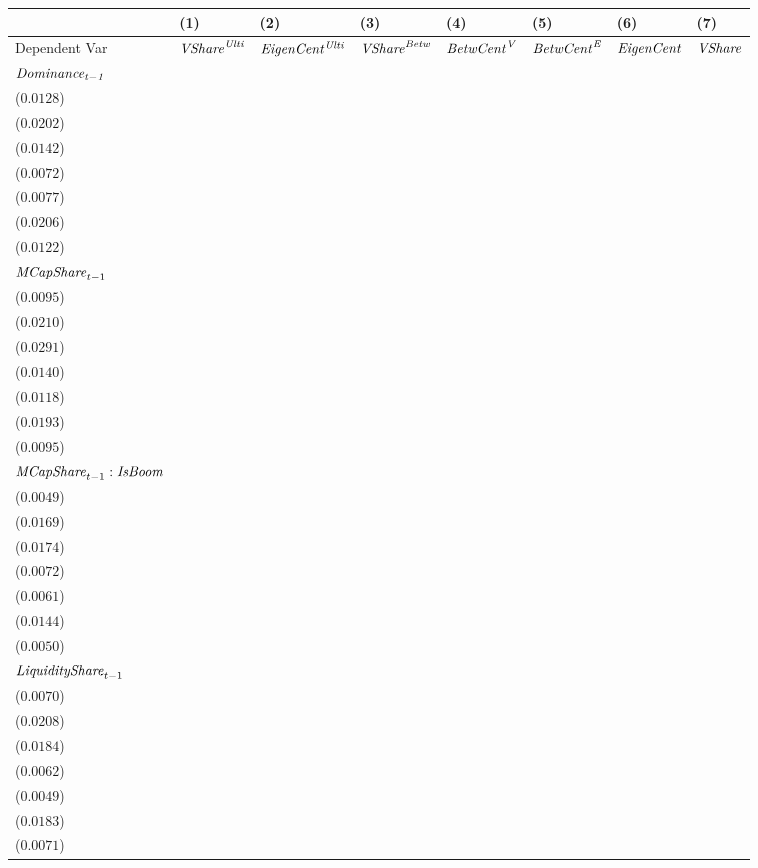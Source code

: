 \begin{tabular}{llllllll}
\toprule
 & (1) & (2) & (3) & (4) & (5) & (6) & (7) \\
\midrule
Dependent Var & ${\it {VShare}^{\it Ulti}}$ & ${\it EigenCent^{\it Ulti}}$ & ${\it VShare}^{\it Betw}$ & ${\it BetwCent}^{\it V}$ & ${\it BetwCent}^{\it E}$ & ${\it EigenCent}$ & ${\it VShare}$ \\
$\it Dominance_{t-1}$ & \makecell{$0.8679^{***}$ \\ ($0.0128$)} & \makecell{$0.8127^{***}$ \\ ($0.0202$)} & \makecell{$0.8594^{***}$ \\ ($0.0142$)} & \makecell{$0.9440^{***}$ \\ ($0.0072$)} & \makecell{$0.9456^{***}$ \\ ($0.0077$)} & \makecell{$0.8242^{***}$ \\ ($0.0206$)} & \makecell{$0.8638^{***}$ \\ ($0.0122$)} \\
${\it MCapShare}_{t-1}$ & \makecell{$0.0128^{}$ \\ ($0.0095$)} & \makecell{$-0.0084^{}$ \\ ($0.0210$)} & \makecell{$0.0044^{}$ \\ ($0.0291$)} & \makecell{$0.0296^{**}$ \\ ($0.0140$)} & \makecell{$0.0331^{***}$ \\ ($0.0118$)} & \makecell{$-0.0268^{}$ \\ ($0.0193$)} & \makecell{$0.0084^{}$ \\ ($0.0095$)} \\
${\it MCapShare}_{t-1}:{\it IsBoom}$ & \makecell{$-0.0031^{}$ \\ ($0.0049$)} & \makecell{$-0.0338^{**}$ \\ ($0.0169$)} & \makecell{$0.0650^{***}$ \\ ($0.0174$)} & \makecell{$0.0208^{***}$ \\ ($0.0072$)} & \makecell{$0.0103^{*}$ \\ ($0.0061$)} & \makecell{$-0.0237^{}$ \\ ($0.0144$)} & \makecell{$0.0044^{}$ \\ ($0.0050$)} \\
${\it LiquidityShare}_{t-1}$ & \makecell{$0.0421^{***}$ \\ ($0.0070$)} & \makecell{$0.0748^{***}$ \\ ($0.0208$)} & \makecell{$0.1181^{***}$ \\ ($0.0184$)} & \makecell{$0.0199^{***}$ \\ ($0.0062$)} & \makecell{$0.0173^{***}$ \\ ($0.0049$)} & \makecell{$0.0680^{***}$ \\ ($0.0183$)} & \makecell{$0.0484^{***}$ \\ ($0.0071$)} \\

\end{tabular}
